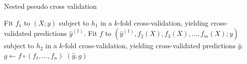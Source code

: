 \begin{algorithm}
\caption{Nested pseudo cross validation} \label{alg:nested-pcv}
    \begin{algorithmic}[1]
            \State Fit $f_1$ to $(X; y)$ subject to $h_1$ in a $k$-fold cross-validation, 
                yielding cross-validated predictions $\hat{y}^{(1)}$.
            \State Fit $f$ to $(\hat{y}^{(1)}, f_2(X), f_3(X), \ldots, f_m(X); y)$ 
                subject to $h_2$ in a $k$-fold cross-validation, yielding 
                cross-validated predictions $\hat{y}$.
            \State $g \gets f \circ (f_1, \ldots, f_n)$
            \State \Return $(\hat{y}, g)$
        \EndFunction
    \end{algorithmic}
\end{algorithm}
